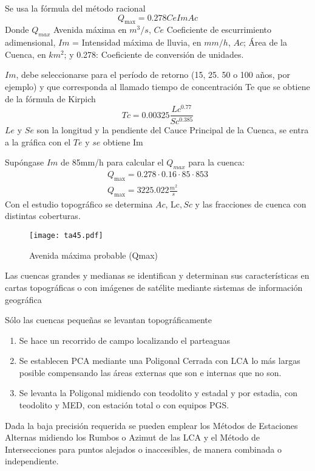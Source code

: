       Se usa la fórmula del método racional
      \begin{equation}
        Q_{\max} = 0.278CeImAc
      \end{equation}
      Donde $Q_{max}$ Avenida máxima en $m^3/s$, $Ce$ Coeficiente de escurrimiento adimensional, $Im$ = Intensidad máxima de lluvia, en $mm/h$, $Ac$; Área de la Cuenca, en $km^2$; y 0.278: Coeficiente de conversión de unidades.
      
      $Im$, debe seleccionarse para el período de retorno (15, 25. 50 o 100 años, por ejemplo) y que corresponda al llamado tiempo de concentración Te que se obtiene de la fórmula de Kirpich
      \begin{equation}
        Tc =0.00325\frac{Lc^{0.77}}{Sc^{0.385}}
      \end{equation}
      $Le$ y $Se$ son la longitud y la pendiente del Cauce Principal de la Cuenca, se entra a la gráfica con el $Te$ y $se$ obtiene Im
      
      Supóngase $Im$ de 85mm/h para calcular el $Q_{max}$ para la cuenca:
      \begin{align*}
        Q_{\max } = 0.278\cdot 0.16\cdot 85\cdot 853\\
        Q_{\max } = 3225.022 \frac{m^2}{s}
      \end{align*}
      Con el estudio topográfico se determina $Ac$, Lc$, Sc$ y las fracciones de cuenca con distintas coberturas.
      \begin{figure}[h!]
      \centering
        \texttt{[image: ta45.pdf]}
        \caption{Avenida máxima probable (Qmax)}
        \label{ta45}
      \end{figure}
      
      Las cuencas grandes y medianas se identifican y determinan sus características en cartas topográficas o con imágenes de satélite mediante sistemas de información geográfica
      
      Sólo las cuencas pequeñas se levantan topográficamente
      
      \begin{enumerate}
        \item Se hace un recorrido de campo localizando el parteaguas
        \item  Se establecen PCA mediante una Poligonal Cerrada con LCA lo más largas posible compensando las áreas externas que son e internas que no son.
        \item Se levanta la Poligonal midiendo con teodolito y estadal y por estadia, con teodolito y MED, con estación total o con equipos PGS.
      \end{enumerate}
      Dada la baja precisión requerida se pueden emplear los Métodos de Estaciones Alternas midiendo los Rumbos o Azimut de las LCA y el Método de Intersecciones para puntos alejados o inaccesibles, de manera combinada o independiente.

